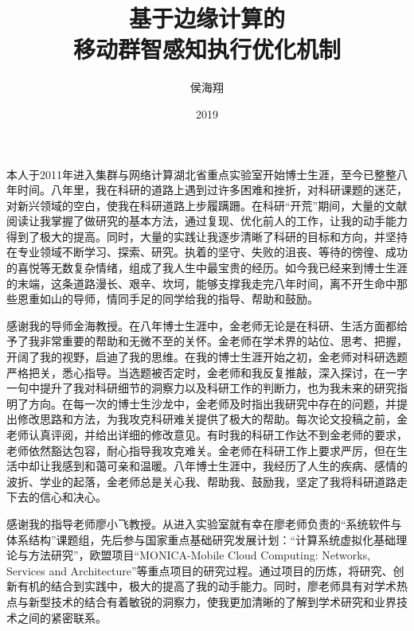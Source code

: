 \documentclass[format=draft,language=chinese,degree=phd,table,usenames,dvipsnames]{hustthesis}
\title{基于边缘计算的\\移动群智感知执行优化机制}{Execution Optimization Mechanisms for \protect{\\} Edge Computing empowered Mobile Crowdsensing}
\author{侯海翔}{Haixiang Hou}
\date{2019}{8}{13}
\begin{document}
\frontmatter
\maketitle
\makeabstract
\tableofcontents
\listoffigures
\listoftables
\mainmatter













\begin{ack}

本人于2011年进入集群与网络计算湖北省重点实验室开始博士生涯，至今已整整八年时间。八年里，我在科研的道路上遇到过许多困难和挫折，对科研课题的迷茫，对新兴领域的空白，使我在科研道路上步履蹒跚。在科研“开荒”期间，大量的文献阅读让我掌握了做研究的基本方法，通过复现、优化前人的工作，让我的动手能力得到了极大的提高。同时，大量的实践让我逐步清晰了科研的目标和方向，并坚持在专业领域不断学习、探索、研究。执着的坚守、失败的沮丧、等待的徬徨、成功的喜悦等无数复杂情绪，组成了我人生中最宝贵的经历。如今我已经来到博士生涯的末端，这条道路漫长、艰辛、坎坷，能够支撑我走完八年时间，离不开生命中那些恩重如山的导师，情同手足的同学给我的指导、帮助和鼓励。

感谢我的导师金海教授。在八年博士生涯中，金老师无论是在科研、生活方面都给予了我非常重要的帮助和无微不至的关怀。金老师在学术界的站位、思考、把握，开阔了我的视野，启迪了我的思维。在我的博士生涯开始之初，金老师对科研选题严格把关，悉心指导。当选题被否定时，金老师和我反复推敲，深入探讨，在一字一句中提升了我对科研细节的洞察力以及科研工作的判断力，也为我未来的研究指明了方向。在每一次的博士生沙龙中，金老师及时指出我研究中存在的问题，并提出修改思路和方法，为我攻克科研难关提供了极大的帮助。每次论文投稿之前，金老师认真评阅，并给出详细的修改意见。有时我的科研工作达不到金老师的要求，老师依然豁达包容，耐心指导我攻克难关。金老师在科研工作上要求严厉，但在生活中却让我感到和蔼可亲和温暖。八年博士生涯中，我经历了人生的疾病、感情的波折、学业的起落，金老师总是关心我、帮助我、鼓励我，坚定了我将科研道路走下去的信心和决心。

感谢我的指导老师廖小飞教授。从进入实验室就有幸在廖老师负责的“系统软件与体系结构”课题组，先后参与国家重点基础研究发展计划：“计算系统虚拟化基础理论与方法研究”，欧盟项目“MONICA-Mobile Cloud Computing: Networks, Services and Architecture”等重点项目的研究过程。通过项目的历炼，将研究、创新有机的结合到实践中，极大的提高了我的动手能力。同时，廖老师具有对学术热点与新型技术的结合有着敏锐的洞察力，使我更加清晰的了解到学术研究和业界技术之间的紧密联系。


\end{ack}
\end{document}
